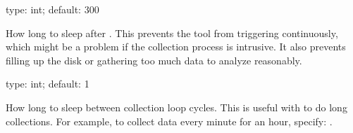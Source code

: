 \documentclass[letterpaper,10pt,english]{sphinxmanual}
\begin{document}
\begin{fulllineitems}
\label{\detokenize{mariadb-stat:cmdoption-mariadb-stat-sleep}}
\sphinxAtStartPar
type: int; default: 300

\sphinxAtStartPar
How long to sleep after {\hyperref[\detokenize{mariadb-stat:cmdoption-mariadb-stat-collect}]{}}.  This prevents the tool
from triggering continuously, which might be a problem if the collection process is intrusive.
It also prevents filling up the disk or gathering too much data to analyze
reasonably.

\end{fulllineitems}


\begin{fulllineitems}
\label{\detokenize{mariadb-stat:cmdoption-mariadb-stat-sleep-collect}}
\sphinxAtStartPar
type: int; default: 1

\sphinxAtStartPar
How long to sleep between collection loop cycles.  This is useful with
 to do long collections.  For example, to collect data every
minute for an hour, specify: .

\end{fulllineitems}

\end{document}
